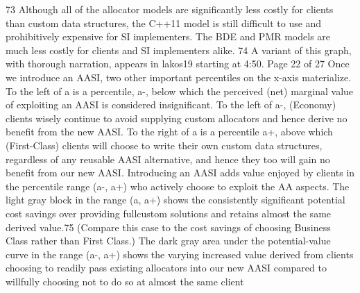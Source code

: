 73 Although all of the allocator models are significantly less costly for clients than custom data
structures, the C++11 model is still difficult to use and prohibitively expensive for SI implementers.
The BDE and PMR models are much less costly for clients and SI implementers alike.
74 A variant of this graph, with thorough narration, appears in lakos19 starting at 4:50. 
Page 22 of 27
Once we introduce an AASI, two other important percentiles on the x-axis
materialize. To the left of a is a percentile, a-, below which the perceived (net)
marginal value of exploiting an AASI is considered insignificant. To the left of a-,
(Economy) clients wisely continue to avoid supplying custom allocators and hence
derive no benefit from the new AASI. To the right of a is a percentile a+, above which
(First-Class) clients will choose to write their own custom data structures, regardless
of any reusable AASI alternative, and hence they too will gain no benefit from our
new AASI.
Introducing an AASI adds value enjoyed by clients in the percentile range (a-, a+)
who actively choose to exploit the AA aspects. The light gray block in the range (a,
a+) shows the consistently significant potential cost savings over providing fullcustom solutions and retains almost the same derived value.75 (Compare this case to
the cost savings of choosing Business Class rather than First Class.) The dark gray
area under the potential-value curve in the range (a-, a+) shows the varying
increased value derived from clients choosing to readily pass existing allocators into
our new AASI compared to willfully choosing not to do so at almost the same client

